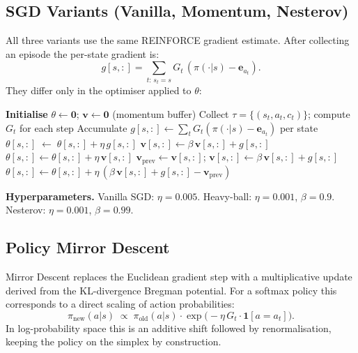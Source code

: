 \documentclass[11pt]{article}
\begin{document}
\subsection{SGD Variants (Vanilla, Momentum, Nesterov)}

All three variants use the same REINFORCE gradient estimate.  After collecting
an episode the per-state gradient is:
\[
    g[s,:] = \sum_{t:\,s_t=s} G_t\,(\pi(\cdot|s) - \mathbf{e}_{a_t}).
\]
They differ only in the optimiser applied to $\theta$:

\begin{algorithm}[H]
\caption{SGD Policy Gradient (vanilla / momentum / Nesterov)}
\label{alg:sgd}
\begin{algorithmic}[1]
\State \textbf{Initialise} $\theta \leftarrow \mathbf{0}$;\;
       $\mathbf{v} \leftarrow \mathbf{0}$ (momentum buffer)
    \State Collect $\tau = \{(s_t,a_t,c_t)\}$;\; compute $G_t$ for each step
    \State Accumulate $g[s,:] \leftarrow \sum_t G_t(\pi(\cdot|s)-\mathbf{e}_{a_t})$ per state
         
            \State $\theta[s,:] \;\leftarrow\; \theta[s,:] + \eta\, g[s,:]$
         
            \State $\mathbf{v}[s,:] \leftarrow \beta\,\mathbf{v}[s,:] + g[s,:]$
            \State $\theta[s,:] \leftarrow \theta[s,:] + \eta\,\mathbf{v}[s,:]$
        \Else {}
            \State $\mathbf{v}_{\text{prev}} \leftarrow \mathbf{v}[s,:]$;\;
                   $\mathbf{v}[s,:] \leftarrow \beta\,\mathbf{v}[s,:] + g[s,:]$
            \State $\theta[s,:] \leftarrow \theta[s,:] + \eta\,(\beta\,\mathbf{v}[s,:] + g[s,:] - \mathbf{v}_{\text{prev}})$
        \EndIf
    \EndFor
\EndFor
\end{algorithmic}
\end{algorithm}

\textbf{Hyperparameters.}  Vanilla SGD: $\eta=0.005$.  Heavy-ball: $\eta=0.001$,
$\beta=0.9$.  Nesterov: $\eta=0.001$, $\beta=0.99$.

\subsection{Policy Mirror Descent}

Mirror Descent replaces the Euclidean gradient step with a multiplicative
update derived from the KL-divergence Bregman potential.  For a softmax policy
this corresponds to a direct scaling of action probabilities:
\[
    \pi_{\text{new}}(a|s) \;\propto\; \pi_{\text{old}}(a|s)\cdot
    \exp\!\bigl(-\eta\, G_t\cdot\mathbf{1}[a = a_t]\bigr).
\]
In log-probability space this is an additive shift followed by renormalisation,
keeping the policy on the simplex by construction.
\end{document}
